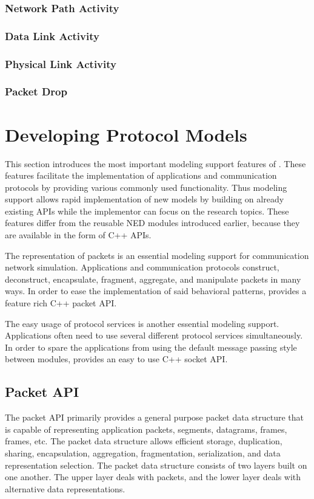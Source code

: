 %
\subsubsection*{Network Path Activity}
%

%
\subsubsection*{Data Link Activity}
%

%
\subsubsection*{Physical Link Activity}
%

%
\subsubsection*{Packet Drop}
%

%
\section{Developing Protocol Models}
\label{sec:developing-protocol-models}
This section introduces the most important modeling support features of \inet. These features facilitate the implementation of applications and communication protocols by providing various commonly used functionality. Thus modeling support allows rapid implementation of new models by building on already existing APIs while the implementor can focus on the research topics. These features differ from the reusable NED modules introduced earlier, because they are available in the form of C++ APIs.

The representation of packets is an essential modeling support for communication network simulation. Applications and communication protocols construct, deconstruct, encapsulate, fragment, aggregate, and manipulate packets in many ways. In order to ease the implementation of said behavioral patterns, \inet provides a feature rich C++ packet API.

The easy usage of protocol services is another essential modeling support. Applications often need to use several different protocol services simultaneously. In order to spare the applications from using the default \omnet message passing style between modules, \inet provides an easy to use C++ socket API.

\subsection{Packet API}
\label{subsec:packet-api}
The packet API primarily provides a general purpose packet data structure that is capable of representing application packets,  segments,  datagrams,  frames,  frames, etc. The packet data structure allows efficient storage, duplication, sharing, encapsulation, aggregation, fragmentation, serialization, and data representation selection. The packet data structure consists of two layers built on one another. The upper layer deals with packets, and the lower layer deals with alternative data representations.

